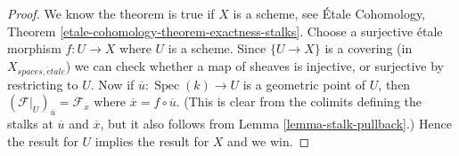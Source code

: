 \documentclass[10pt,a4paper]{amsart}
\theoremstyle{plain}
\theoremstyle{definition}
\theoremstyle{remark}
\numberwithin{equation}{subsection}
\def\Spec{\mathop{\mathrm{Spec}}}
\def\etale{{\acute{e}tale}}
\begin{document}
\begin{proof}
We know the theorem is true if $X$ is a scheme, see
\'Etale Cohomology, Theorem \ref{etale-cohomology-theorem-exactness-stalks}.
Choose a surjective \'etale morphism $f : U \to X$ where $U$ is a scheme.
Since $\{U \to X\}$ is a covering (in $X_{spaces, \etale}$) we can check
whether a map of sheaves is injective, or surjective by restricting
to $U$. Now if $\overline{u} : \Spec(k) \to U$ is a geometric
point of $U$, then
$(\mathcal{F}|_U)_{\overline{u}} = \mathcal{F}_{\overline{x}}$
where $\overline{x} = f \circ \overline{u}$. (This is clear from the
colimits defining the stalks at $\overline{u}$ and $\overline{x}$, but
it also follows from
Lemma \ref{lemma-stalk-pullback}.)
Hence the result for $U$ implies the result for $X$ and we win.
\end{proof}
\end{document}
